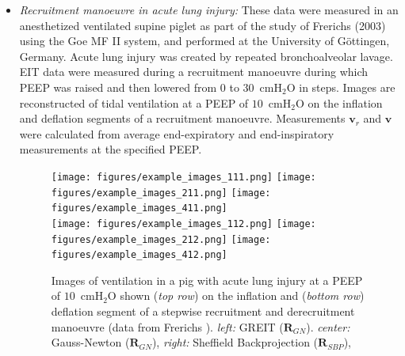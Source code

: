 \documentclass[12pt]{iopart}
\newcommand{\vB}{\mbox{$\mathbf{v}$}}
\newcommand{\RB}{\mbox{$\mathbf{R}$}}
\begin{document}
\begin{itemize}
%
%
\item
{\em Recruitment manoeuvre in acute lung injury:}
These data were measured in an anesthetized
ventilated supine piglet as part of the study of
Frerichs \etal  (2003) using the 
Goe MF II system, and performed at the
University of G\"ottingen, Germany. Acute lung injury
was created by repeated
bronchoalveolar lavage. EIT data were
measured during a recruitment manoeuvre
during which PEEP was raised and then
lowered from 0 to 30~cmH$_2$O in steps. 
Images are reconstructed of tidal ventilation
at a PEEP of $10$~cmH$_2$O on the inflation
and deflation segments of a recruitment manoeuvre.
Measurements $\vB_r$ and $\vB$
were calculated from average end-expiratory
and end-inspiratory measurements at the specified
PEEP.

\begin{figure}[bhtp]
\begin{center}
\texttt{[image: figures/example\_images\_111.png]}
\texttt{[image: figures/example\_images\_211.png]}
\texttt{[image: figures/example\_images\_411.png]}
\\
\texttt{[image: figures/example\_images\_112.png]}
\texttt{[image: figures/example\_images\_212.png]}
\texttt{[image: figures/example\_images\_412.png]}
\caption{
\label{fig:Frerichs03images}
Images of ventilation in a pig with
acute lung injury 
at a PEEP of $10$~cmH$_2$O shown ({\em top row})
on the inflation and ({\em bottom row})
deflation segment of a stepwise recruitment and derecruitment manoeuvre 
(data from Frerichs ).
{\em left:} GREIT ($\RB_{GN}$).
{\em center:} Gauss-Newton ($\RB_{GN}$),
{\em right:} Sheffield Backprojection ($\RB_{SBP}$),
}
\end{center}
\end{figure}


\end{itemize}
\end{document}
